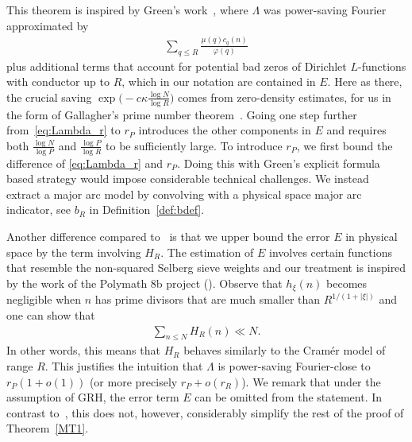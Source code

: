 \documentclass[12pt]{amsart}
\theoremstyle{definition}
\theoremstyle{remark}
\numberwithin{equation}{section}
\newcommand{\1}{\mathbf{1}}
\begin{document}
This theorem is inspired by Green's work~\cite{green-sarkozy}, where $\Lambda$ was power-saving Fourier approximated by
\begin{align}\label{eq:Lambda_r}
    \sum_{q\leq R}\frac{\mu(q)c_q(n)}{\varphi(q)}
\end{align}
plus additional terms that account for potential bad zeros of Dirichlet $L$-functions with conductor up to $R$, which in our notation are contained in $E$. Here as there, the crucial saving $\exp\bigl( -c \kappa \frac{\log N}{\log R} \bigr)$ comes from zero-density estimates, for us in the form of Gallagher's prime number theorem~\cite{Gal}.  Going one step further from~\eqref{eq:Lambda_r} to $r_P$ introduces the other components in $E$ and requires both $\frac{\log N}{\log P}$ and $\frac{\log P}{\log R}$ to be sufficiently large. To introduce $r_P$, we first bound the difference of \eqref{eq:Lambda_r} and $r_P$. Doing this with Green's explicit formula based strategy would impose considerable technical challenges. We instead extract a major arc model by convolving with a physical space major arc indicator, see $b_R$ in Definition~\ref{def:bdef}.

Another difference compared to~\cite{green-sarkozy} is that we upper bound the error $E$ in physical space by the term involving $H_R$. The estimation of $E$ involves certain functions that resemble the non-squared Selberg sieve weights and our treatment is inspired by the work of the Polymath 8b project (\cite[Proposition 4.2]{polymath}). Observe that $h_\xi(n)$ becomes negligible when $n$ has prime divisors that are much smaller than $R^{1/(1+|\xi|)}$ and one can show that
\begin{align}\label{eq:HRintro}
    \sum_{n\leq N} H_R(n)\ll N.
\end{align}
In other words, this means that $H_R$ behaves similarly to the Cram\'er model of range $R$. This justifies the intuition that $\Lambda$ is power-saving Fourier-close to $r_P(1+o(1))$ (or more precisely $r_P+o(r_R)$). We remark that under the assumption of GRH, the error term $E$ can be omitted from the statement. In contrast to~\cite{green-sarkozy}, this does not, however, considerably simplify the rest of the proof of Theorem~\ref{MT1}.
\end{document}
